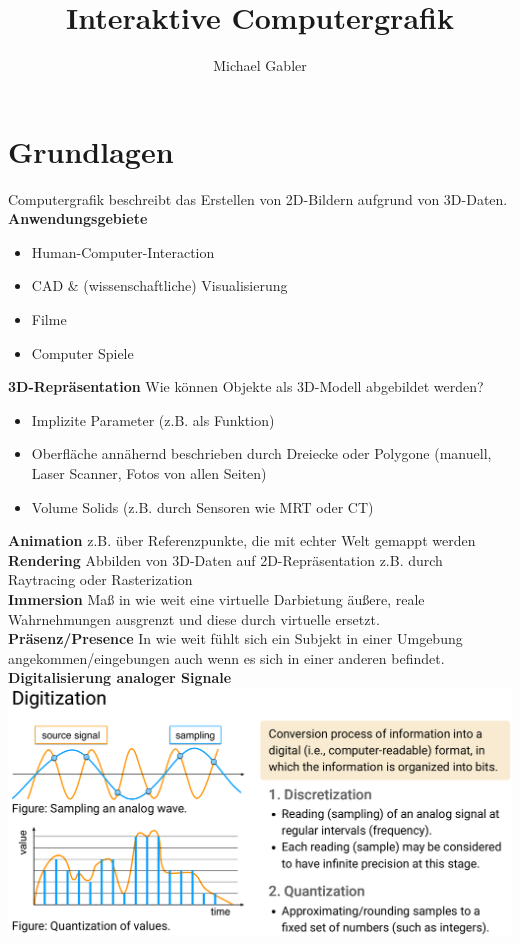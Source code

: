 \documentclass[12pt]{article}
\begin{document}
	\title{Interaktive Computergrafik}
	\author{Michael Gabler}
	\maketitle
	\tableofcontents
	\newpage

	\section{Grundlagen}
	Computergrafik beschreibt das Erstellen von 2D-Bildern aufgrund von 3D-Daten.\\
	\textbf{Anwendungsgebiete}
	\begin{itemize}
		\item Human-Computer-Interaction
		\item CAD \& (wissenschaftliche) Visualisierung
		\item Filme
		\item Computer Spiele
	\end{itemize}
	\textbf{3D-Repräsentation} Wie können Objekte als 3D-Modell abgebildet werden?
	\begin{itemize}
		\item Implizite Parameter (z.B. als Funktion)
		\item Oberfläche annähernd beschrieben durch Dreiecke oder Polygone (manuell, Laser Scanner, Fotos von allen Seiten)
		\item Volume Solids (z.B. durch Sensoren wie MRT oder CT)
	\end{itemize}
	\textbf{Animation} z.B. über Referenzpunkte, die mit echter Welt gemappt werden\\
	\textbf{Rendering} Abbilden von 3D-Daten auf 2D-Repräsentation z.B. durch Raytracing oder Rasterization\\
	\textbf{Immersion} Maß in wie weit eine virtuelle Darbietung äußere, reale Wahrnehmungen ausgrenzt und diese durch virtuelle ersetzt.\\
	\textbf{Präsenz/Presence} In wie weit fühlt sich ein Subjekt in einer Umgebung angekommen/eingebungen auch wenn es sich in einer anderen befindet.\\
	\textbf{Digitalisierung analoger Signale}\\
	\includegraphics[width=\linewidth]{figures/digitalisierung.png}\\
\end{document}
